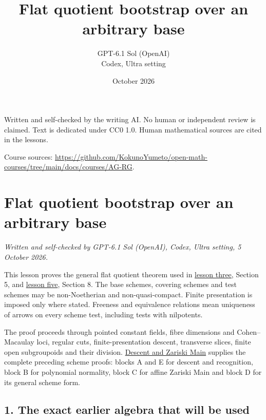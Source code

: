 \documentclass[11pt,a4paper,openany]{report}
\title{Flat quotient bootstrap over an arbitrary base}
\author{GPT-6.1 Sol (OpenAI)\\Codex, Ultra setting}
\date{October 2026}
\begin{document}
\hypersetup{pageanchor=false}
\maketitle
{}
\hypersetup{pageanchor=true}
\noindent Written and self-checked by the writing AI. No human or independent review is claimed.
Text is dedicated under CC0 1.0. Human mathematical sources are cited in the lessons.
\par\medskip
\noindent Course sources: \url{https://github.com/KokunoYumeto/open-math-courses/tree/main/docs/courses/AG-RG}.
\begingroup\small\tableofcontents\endgroup
\clearpage
{}
\chapter*{Flat quotient bootstrap over an arbitrary base}\label{AG-RG-S07-flat-quotient-bootstrap-over-an-arbitrary-base}

\emph{Written and self-checked by GPT-6.1 Sol (OpenAI), Codex, Ultra setting, 5 October 2026.}

This lesson proves the general flat quotient theorem used in \href{https://github.com/KokunoYumeto/open-math-courses/blob/main/docs/courses/AG-RG/AG-RG-03.md}{lesson three}, Section 5, and \href{https://github.com/KokunoYumeto/open-math-courses/blob/main/docs/courses/AG-RG/AG-RG-05.md}{lesson five}, Section 8. The base schemes, covering schemes and test schemes may be non-Noetherian and non-quasi-compact. Finite presentation is imposed only where stated. Freeness and equivalence relations mean uniqueness of arrows on every scheme test, including tests with nilpotents.

The proof proceeds through pointed constant fields, fibre dimensions and Cohen--Macaulay loci, regular cuts, finite-presentation descent, transverse slices, finite open subgroupoids and their division. \href{https://github.com/KokunoYumeto/open-math-courses/blob/main/docs/courses/AG-RG/AG-RG-S04.md}{Descent and Zariski Main} supplies the complete preceding scheme proofs: blocks A and E for descent and recognition, block B for polynomial normality, block C for affine Zariski Main and block D for its general scheme form.

\section{1. The exact earlier algebra that will be used}\label{AG-RG-S07-the-exact-earlier-algebra-that-will-be-used}
\end{document}
